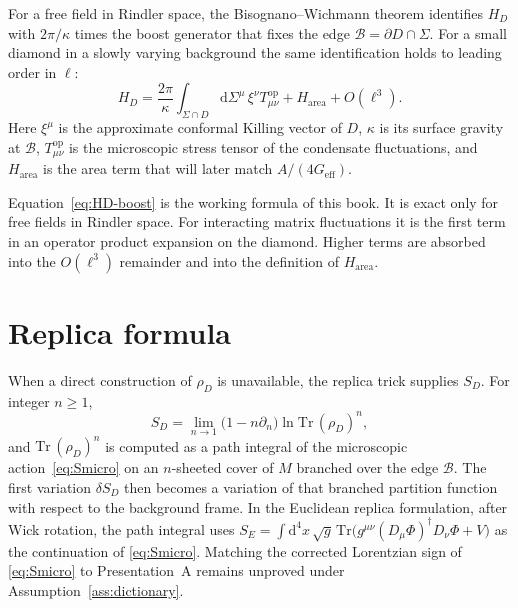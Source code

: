 For a free field in Rindler space, the Bisognano--Wichmann theorem
identifies \(H_D\) with \(2\pi/\kappa\) times the boost generator
that fixes the edge \(\mathcal{B}=\partial D\cap\Sigma\). For a small
diamond in a slowly varying background the same identification holds
to leading order in \(\ell\):
\begin{equation}
  \label{eq:HD-boost}
  H_D
  =\frac{2\pi}{\kappa}
   \int_{\Sigma\cap D}
   \mathrm{d}\Sigma^\mu\,\xi^\nu T_{\mu\nu}^{\mathrm{op}}
   +H_{\mathrm{area}}
   +O(\ell^3).
\end{equation}
Here \(\xi^\mu\) is the approximate conformal Killing vector of \(D\),
\(\kappa\) is its surface gravity at \(\mathcal{B}\),
\(T_{\mu\nu}^{\mathrm{op}}\) is the microscopic stress tensor of the
condensate fluctuations, and \(H_{\mathrm{area}}\) is the area term
that will later match \(A/(4G_{\mathrm{eff}})\).

Equation~\eqref{eq:HD-boost} is the working formula of this book. It
is exact only for free fields in Rindler space. For interacting
matrix fluctuations it is the first term in an operator product
expansion on the diamond. Higher terms are absorbed into the
\(O(\ell^3)\) remainder and into the definition of \(H_{\mathrm{area}}\).

\section{Replica formula}
\label{sec:ch6-replica}

When a direct construction of \(\rho_D\) is unavailable, the replica
trick supplies \(S_D\). For integer \(n\ge 1\),
\begin{equation}
  \label{eq:replica}
  S_D
  =\lim_{n\to 1}
   \bigl(1-n\partial_n\bigr)
   \ln\mathrm{Tr}\,(\rho_D)^n,
\end{equation}
and \(\mathrm{Tr}\,(\rho_D)^n\) is computed as a path integral of
the microscopic action~\eqref{eq:Smicro} on an \(n\)-sheeted cover
of \(M\) branched over the edge \(\mathcal{B}\). The first variation
\(\delta S_D\) then becomes a variation of that branched partition
function with respect to the background frame.
In the Euclidean replica formulation, after Wick rotation, the path
integral uses
\(S_E=\int\mathrm{d}^4x\,\sqrt{g}\,\mathrm{Tr}\bigl(
g^{\mu\nu}(D_\mu\Phi)^\dagger D_\nu\Phi+V\bigr)\) as the continuation of
\eqref{eq:Smicro}. Matching the corrected Lorentzian sign of
\eqref{eq:Smicro} to Presentation~A remains unproved under
Assumption~\ref{ass:dictionary}.

